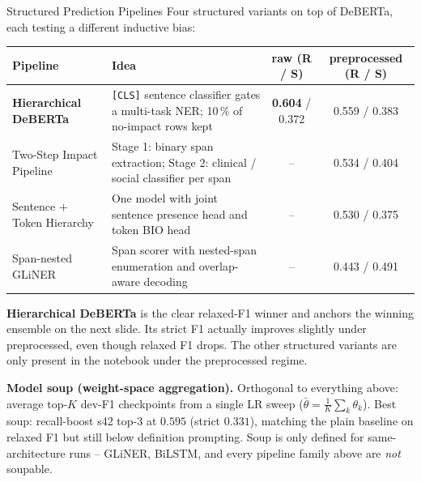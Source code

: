 \documentclass[aspectratio=169,10pt]{beamer}
\begin{document}
\begin{frame}{Structured Prediction Pipelines}
  \footnotesize
  Four structured variants on top of DeBERTa, each testing a different inductive bias:
  \vspace{-0.3em}
  \begin{center}\scriptsize
  \begin{tabular}{p{3.2cm}p{4.8cm}cc}
    \toprule
    Pipeline & Idea & raw (R / S) & preprocessed (R / S) \\
    \midrule
    \textbf{Hierarchical DeBERTa} & \texttt{[CLS]} sentence classifier gates a multi-task NER; 10\,\% of no-impact rows kept & \textbf{0.604} / 0.372 & 0.559 / 0.383 \\[2pt]
    Two-Step Impact Pipeline & Stage 1: binary span extraction; Stage 2: clinical / social classifier per span & -- & 0.534 / 0.404 \\[2pt]
    Sentence $+$ Token Hierarchy & One model with joint sentence presence head and token BIO head & -- & 0.530 / 0.375 \\[2pt]
    Span-nested GLiNER & Span scorer with nested-span enumeration and overlap-aware decoding & -- & 0.443 / 0.491 \\
    \bottomrule
  \end{tabular}
  \end{center}
  \vspace{-0.3em}
  \textbf{Hierarchical DeBERTa} is the clear relaxed-F1 winner and anchors the winning ensemble on the next slide. Its strict F1 actually improves slightly under preprocessed, even though relaxed F1 drops. The other structured variants are only present in the notebook under the preprocessed regime.
  \medskip

  \textcolor{neutral}{\scriptsize \textbf{Model soup (weight-space aggregation).} Orthogonal to everything above: average top-$K$ dev-F1 checkpoints from a single LR sweep ($\bar\theta = \tfrac{1}{K}\sum_k \theta_k$). Best soup: recall-boost s42 top-3 at $0.595$ (strict $0.331$), matching the plain baseline on relaxed F1 but still below definition prompting. Soup is only defined for same-architecture runs -- GLiNER, BiLSTM, and every pipeline family above are \emph{not} soupable.}
\end{frame}
\end{document}
